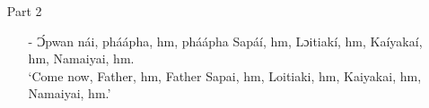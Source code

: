 \documentclass[output=paper,colorlinks,citecolor=brown]{langscibook}
\begin{document}
 


\begin{enumerate}
    \item[]     Part 2
    \begin{enumerate}
        \item[-]    Ɔ́pwan nái, pháápha, hm, pháápha Sapáí, hm, Lɔitiakí, hm, Kaíyakaí, hm, Namaiyai, hm.\\
                    `Come now, Father, hm, Father Sapai, hm, Loitiaki, hm, Kaiyakai, hm, Namaiyai, hm.'
    \end{enumerate}
\end{enumerate}
\end{document}
